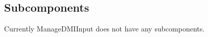 \subsection{Subcomponents}\label{s:ManageDMIInput_subcomponents}

Currently ManageDMIInput does not have any subcomponents.

%

